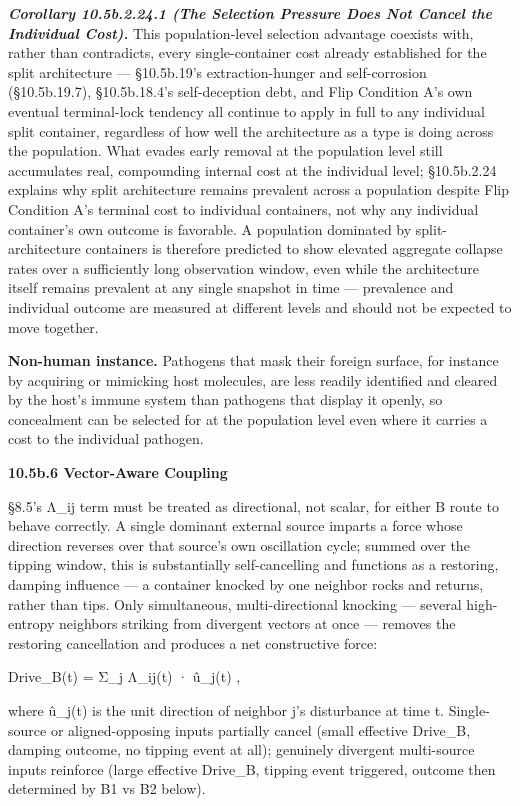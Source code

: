 \documentclass[
]{article}
\begin{document}
\emph{\textbf{Corollary 10.5b.2.24.1 (The Selection Pressure Does Not
Cancel the Individual Cost).}} This population-level selection advantage
coexists with, rather than contradicts, every single-container cost
already established for the split architecture --- §10.5b.19's
extraction-hunger and self-corrosion (§10.5b.19.7), §10.5b.18.4's
self-deception debt, and Flip Condition A's own eventual terminal-lock
tendency all continue to apply in full to any individual split
container, regardless of how well the architecture as a type is doing
across the population. What evades early removal at the population level
still accumulates real, compounding internal cost at the individual
level; §10.5b.2.24 explains why split architecture remains prevalent
across a population despite Flip Condition A's terminal cost to
individual containers, not why any individual container's own outcome is
favorable. A population dominated by split-architecture containers is
therefore predicted to show elevated aggregate collapse rates over a
sufficiently long observation window, even while the architecture itself
remains prevalent at any single snapshot in time --- prevalence and
individual outcome are measured at different levels and should not be
expected to move together.

\textbf{Non-human instance.} Pathogens that mask their foreign surface,
for instance by acquiring or mimicking host molecules, are less readily
identified and cleared by the host's immune system than pathogens that
display it openly, so concealment can be selected for at the population
level even where it carries a cost to the individual pathogen.

\textbf{10.5b.6 Vector-Aware Coupling}

§8.5's Λ\_ij term must be treated as directional, not scalar, for either
B route to behave correctly. A single dominant external source imparts a
force whose direction reverses over that source's own oscillation cycle;
summed over the tipping window, this is substantially self-cancelling
and functions as a restoring, damping influence --- a container knocked
by one neighbor rocks and returns, rather than tips. Only simultaneous,
multi-directional knocking --- several high-entropy neighbors striking
from divergent vectors at once --- removes the restoring cancellation
and produces a net constructive force:

Drive\_B(t) = Σ\_j Λ\_ij(t) · û\_j(t) ,

where û\_j(t) is the unit direction of neighbor j's disturbance at time
t. Single-source or aligned-opposing inputs partially cancel (small
effective Drive\_B, damping outcome, no tipping event at all); genuinely
divergent multi-source inputs reinforce (large effective Drive\_B,
tipping event triggered, outcome then determined by B1 vs B2 below).
\end{document}
